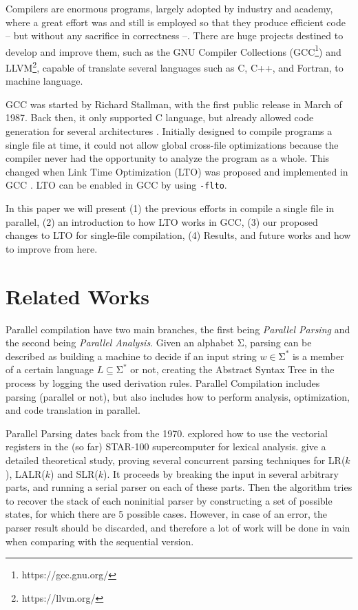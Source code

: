 \documentclass[runningheads]{llncs}
\begin{document}
Compilers are enormous programs, largely adopted by industry and academy, where
a great effort was and still is employed so that they produce efficient code --
but without any sacrifice in correctness --. There are huge projects destined
to develop and improve them, such as the GNU Compiler Collections
(GCC\footnote{https://gcc.gnu.org/}) and LLVM\footnote{https://llvm.org/}, capable
of translate several languages such as C, C++, and Fortran, to machine language.

GCC was started by Richard Stallman, with the first public release in March of
1987. Back then, it
only supported C language, but already allowed code generation for several
architectures \cite{gcc-first-ver}. Initially designed to compile programs a
single file at time, it could not allow global cross-file optimizations because
the compiler never had the opportunity to analyze the program as a whole. This
changed when Link Time Optimization (LTO) was proposed \cite{whoprgoogle} and
implemented in GCC \cite{glek2010optimizing}. LTO can be enabled in GCC by
using \texttt{-flto}.

In this paper we will present (1) the previous efforts in compile a single
file in parallel, (2) an introduction to how LTO works in GCC, (3) our
proposed changes to LTO for single-file compilation, (4) Results, and
future works and how to improve from here.

\section{Related Works}

Parallel compilation have two main branches, the first being \textit{Parallel
Parsing} and the second being \textit{Parallel Analysis}. Given an alphabet
$\mathrm{\Sigma}$, parsing can be described as building a machine to decide if
an input string $w \in \mathrm{\Sigma}^*$ is a member of a certain language $L
\subseteq \mathrm{\Sigma}^*$ or not, creating the Abstract Syntax Tree in the
process by logging the used derivation rules.  Parallel Compilation includes
parsing (parallel or not), but also includes how to perform analysis,
optimization, and code translation in parallel.

Parallel Parsing dates back from the 1970. \cite{Lincoln:1970:PPT:987475.987478}
explored how to use the vectorial registers in the (so far)
STAR-100 supercomputer for lexical analysis.
\cite{fischer1975parsing} give a detailed theoretical study, proving
several concurrent parsing techniques for LR($k$), LALR($k$) and SLR($k$).
It proceeds by breaking the input in several arbitrary parts, and running a
serial parser on each of these parts. Then the algorithm tries to
recover the stack of each noninitial parser by constructing a set of
possible states, for which there are 5 possible cases. However, in case
of an error, the parser result should be discarded, and therefore a lot
of work will be done in vain when comparing with the sequential version.
\end{document}
